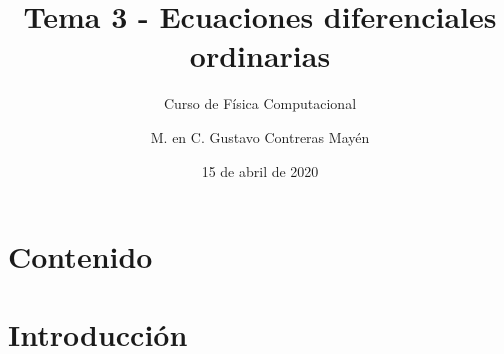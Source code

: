 
\title{Tema 3 - Ecuaciones diferenciales ordinarias}
\subtitle{Curso de Física Computacional}
\author[]{M. en C. Gustavo Contreras Mayén}
\date{15 de abril de 2020}

\maketitle
\fontsize{14}{14}\selectfont
{}
\section*{Contenido}
\section{Introducción}
